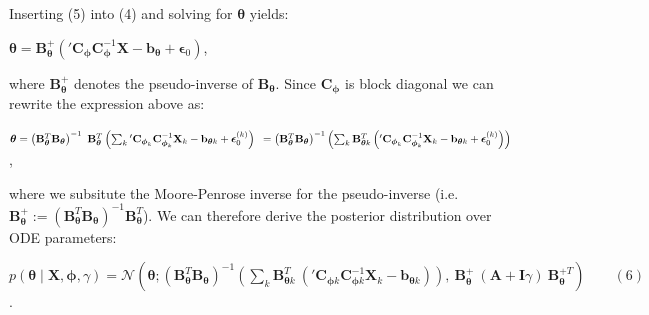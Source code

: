 \begin{par}
Inserting (5) into (4) and solving for $\boldsymbol{\theta}$ yields:
\end{par} \vspace{1em}
\begin{par}
$\boldsymbol{\theta} = \mathbf{B}_{\boldsymbol{\theta}}^+ \left( {'\mathbf{C}_{\boldsymbol{\phi}}}\mathbf{C}_{\boldsymbol{\phi}}^{-1} \mathbf{X} - \mathbf{b}_{\boldsymbol{\theta}} + \boldsymbol{\epsilon}_0\right)$,
\end{par} \vspace{1em}
\begin{par}
where $\mathbf{B}_{\boldsymbol{\theta}}^+$ denotes the pseudo-inverse of $\mathbf{B}_{\boldsymbol{\theta}}$. Since $\mathbf{C}_{\boldsymbol{\phi}}$ is block diagonal we can rewrite the expression above as:
\end{par} \vspace{1em}
\begin{par}
$\boldsymbol{\theta} = \left( \mathbf{B}_{\boldsymbol{\theta}}^T \mathbf{B}_{\boldsymbol{\theta}} \right)^{-1} ~\mathbf{B}_{\boldsymbol{\theta}}^T  \left( \sum_k {'\mathbf{C}_{\boldsymbol{\phi}_k}}\mathbf{C}_{\boldsymbol{\phi}_k}^{-1} \mathbf{X}_k - \mathbf{b}_{\boldsymbol{\theta} k} + \boldsymbol{\epsilon}_0^{(k)} \right)\\ ~= \left( \mathbf{B}_{\boldsymbol{\theta}}^T \mathbf{B}_{\boldsymbol{\theta}} \right)^{-1} \left(\sum_k \mathbf{B}_{\boldsymbol{\theta} k}^T \left( {'\mathbf{C}_{\boldsymbol{\phi}_k}}\mathbf{C}_{\boldsymbol{\phi}_k}^{-1} \mathbf{X}_k - \mathbf{b}_{\boldsymbol{\theta} k} +\boldsymbol{\epsilon}_0^{(k)} \right) \right)$,
\end{par} \vspace{1em}
\begin{par}
where we subsitute the Moore-Penrose inverse for the pseudo-inverse (i.e. $\mathbf{B}_{\boldsymbol{\theta}}^+ := \left( \mathbf{B}_{\boldsymbol{\theta}}^T \mathbf{B}_{\boldsymbol{\theta}}\right)^{-1} \mathbf{B}_{\boldsymbol{\theta}}^T$). We can therefore derive the posterior distribution over ODE parameters:
\end{par} \vspace{1em}
\begin{par}
$p(\boldsymbol{\theta} \mid \mathbf{X}, \boldsymbol{\phi}, \gamma) = \mathcal{N}\left(\boldsymbol{\theta} ; \left( \mathbf{B}_{\boldsymbol{\theta}}^T\mathbf{B}_{\boldsymbol{\theta}} \right)^{-1} \left( \sum_k \mathbf{B}_{\boldsymbol{\theta} k}^T ~\left( {'\mathbf{C}_{\boldsymbol{\phi} k}} \mathbf{C}_{\boldsymbol{\phi} k}^{-1} \mathbf{X}_k -\mathbf{b}_{\boldsymbol{\theta} k} \right) \right), ~ \mathbf{B}_{\boldsymbol{\theta}}^+ ~(\mathbf{A} + \mathbf{I}\gamma) ~ \mathbf{B}_{\boldsymbol{\theta}}^{+T}\right) \qquad (6)$.
\end{par} \vspace{1em}


